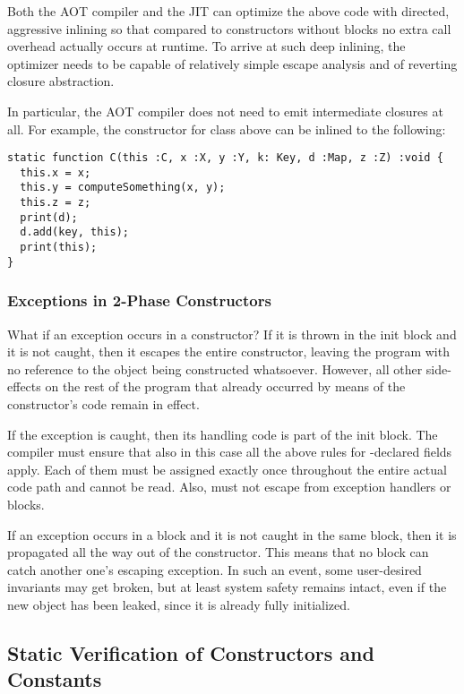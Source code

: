 Both the AOT compiler and the JIT can optimize the above code with directed,
aggressive inlining so that compared to constructors without  blocks
no extra call overhead actually occurs at runtime. To arrive at such deep
inlining, the optimizer needs to be capable of relatively simple escape analysis
and of reverting closure abstraction.

In particular, the AOT compiler does not need to emit intermediate closures at
all. For example, the constructor for class  above can be
inlined to the following:

\begin{minipage}{\linewidth}
\begin{verbatim}
static function C(this :C, x :X, y :Y, k: Key, d :Map, z :Z) :void {
  this.x = x;
  this.y = computeSomething(x, y);
  this.z = z;
  print(d);
  d.add(key, this);
  print(this);
}
\end{verbatim}
\end{minipage}

\subsubsection{Exceptions in 2-Phase Constructors}
What if an exception occurs in a constructor? If it is thrown in the init block
and it is not caught, then it escapes the entire constructor, leaving the
program with no reference to the object being constructed whatsoever. However,
all other side-effects on the rest of the program that already occurred by means
of the constructor's code remain in effect.

If the exception is caught, then its handling code is part of the init block.
The compiler must ensure that also in this case all the above rules for
-declared fields apply. Each of them must be assigned exactly once
throughout the entire actual code path and cannot be read. Also, 
must not escape from exception handlers or  blocks.

If an exception occurs in a  block and it is not caught in the same
block, then it is propagated all the way out of the constructor. This means
that no  block can catch another one's escaping exception. In such
an event, some user-desired invariants may get broken, but at least system
safety remains intact, even if the new object has been leaked, since it is
already fully initialized.

\subsection{Static Verification of Constructors and Constants}

